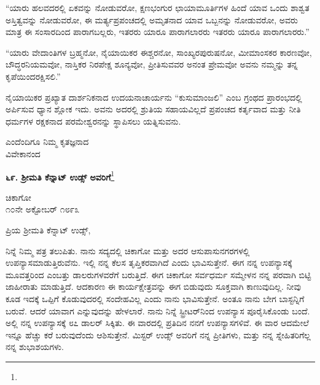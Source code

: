 “ಯಾರು ಹಲವದರಲ್ಲಿ ಏಕವನ್ನು ನೋಡುವರೋ, ಕ್ಷಣಭಂಗುರ ಛಾಯಾಮೂರ್ತಿ\break ಗಳ ಹಿಂದೆ ಯಾವ ಒಂದು ಶಾಶ್ವತ ಅಸ್ತಿತ್ವವನ್ನು ನೋಡುವರೋ, ಈ ಮರ್ತ್ಯಪ್ರಪಂಚದಲ್ಲಿ ಅಮೃತನಾದ ಯಾವ ಒಬ್ಬನನ್ನು ನೋಡುವರೋ, ಅವರು ಮಾತ್ರ ಈ ಸಂಸಾರದಿಂದ ಪಾರಾಗಬಲ್ಲರು, ಇತರರು ಯಾರೂ ಪಾರಾಗಲಾರರು\enginline{-} ಇತರರು ಯಾರೂ ಪಾರಾಗಲಾರರು.”

“ಯಾರು ವೇದಾಂತಿಗಳ ಬ್ರಹ್ಮನೋ, ನೈಯಾಯಿಕರ ಈಶ್ಚರನೋ, ಸಾಂಖ್ಯರ\break ಪುರುಷನೋ, ಮೀಮಾಂಸಕರ ಕಾರಣವೋ, ಬೌದ್ಧರನಿಯಮವೋ, ನಾಸ್ತಿಕರ ನಿರಪೇಕ್ಷ ಶೂನ್ಯವೋ, ಪ್ರೀತಿಸುವವರ ಅನಂತ ಪ್ರೇಮವೋ ಅವನು ನಮ್ಮನ್ನು ತನ್ನ ಕೃಪೆಯಿಂದ\break ರಕ್ಷಿಸಲಿ.”

ನೈಯಾಯಿಕರ ಪ್ರಖ್ಯಾತ ದಾರ್ಶನಿಕನಾದ ಉದಯನಾಚಾರ್ಯನು “ಕುಸುಮಾಂ\break ಜಲಿ” ಎಂಬ ಗ್ರಂಥದ ಪ್ರಾರಂಭದಲ್ಲಿ ಅರ್ಪಿಸುವ ಧ್ಯಾನ ಶ್ಲೋಕ ಇದು. ಅವನು ಅದರಲ್ಲಿ ಶ್ರುತಿಯ ಸಹಾಯವಿಲ್ಲದೆ ಪ್ರಪಂಚದ ಕರ್ತೃವಾದ ಮತ್ತು ನೀತಿ ಧರ್ಮಗಳ ರಕ್ಷಕನಾದ ಪರಮೇಶ್ವರನನ್ನು ಸ್ಥಾಪಿಸಲು ಯತ್ನಿಸುವನು.

\vspace{-.5cm}

{\flushright
ಎಂದೆಂದಿಗೂ ನಿಮ್ಮ ಕೃತಜ್ಞನಾದ\\ವಿವೇಕಾನಂದ\par}

\vspace{-.3cm}

\begin{center}
\textbf{೬೯. ಶ‍್ರೀಮತಿ ಕೆನ್ನಾಟ್ ಉಡ್ಸ್ ಅವರಿಗೆ}\footnote{}
\end{center}

\vspace{-.6cm}

\begin{flushright}
ಚಿಕಾಗೋ\\೧೦ನೇ ಅಕ್ಟೋಬರ್ ೧೮೯೩
\end{flushright}

\noindent
ಪ್ರಿಯ ಶ‍್ರೀಮತಿ ಕೆನ್ನಾಟ್ ಉಡ್ಸ್,

ನಿನ್ನೆ ನಿಮ್ಮ ಪತ್ರ ತಲುಪಿತು. ನಾನು ಸದ್ಯದಲ್ಲಿ ಚಿಕಾಗೋ ಮತ್ತು ಅದರ ಆಸುಪಾಸುನಗರಗಳಲ್ಲಿ ಉಪನ್ಯಾಸಮಾಡುತ್ತಿರುವೆನು. ಇಲ್ಲಿ ನನ್ನ ಕೆಲಸ ತೃಪ್ತಿಕರವಾಗಿದೆ ಎಂದು ಭಾವಿಸುತ್ತೇನೆ. ಈಗ ನನ್ನ ಉಪನ್ಯಾಸಕ್ಕೆ ಮೂವತ್ತರಿಂದ ಎಂಬತ್ತು ಡಾಲರುಗಳವರೆಗೆ ಬರುತ್ತಿದೆ. ಈಗ ಚಿಕಾಗೋ ಸರ್ವಧರ್ಮ ಸಮ್ಮೇಳನ ನನ್ನ ಪರವಾಗಿ ಬಿಟ್ಟಿ ಜಾಹೀರಾತು ಮಾಡುತ್ತಿದೆ. ಆದಕಾರಣ ಈ ಕಾರ್ಯಕ್ಷೇತ್ರವನ್ನು ಈಗ ಬಿಡುವುದು ಸೂಕ್ತವಾಗಿ ಕಾಣುವುದಿಲ್ಲ. ನೀವು ಕೂಡ ಇದಕ್ಕೆ ಒಪ್ಪಿಗೆ ಕೊಡುವುದರಲ್ಲಿ ಸಂದೇಹವಿಲ್ಲ ಎಂದು ನಾನು ಭಾವಿಸುತ್ತೇನೆ. ಅಂತೂ ನಾನು ಬೇಗ ಬಾಸ್ಟನ್ನಿಗೆ ಬರುವೆ. ಆದರೆ ಯಾವಾಗ ಎನ್ನುವುದನ್ನು ಹೇಳಲಾರೆ. ನಾನು ನಿನ್ನೆ ಸ್ಟ್ರೀಟರ್‌ನಿಂದ ಉಪನ್ಯಾಸ ಪೂರೈಸಿಕೊಂಡು ಬಂದೆ. ಅಲ್ಲಿ ನನ್ನ ಉಪನ್ಯಾಸಕ್ಕೆ ೮೭ ಡಾಲರ್ ಸಿಕ್ಕಿತು. ಈ ವಾರದಲ್ಲಿ ಪ್ರತಿದಿನ ನನಗೆ ಉಪನ್ಯಾಸಗಳಿವೆ. ಈ ವಾರ ಆದಮೇಲೆ ಇನ್ನೂ ಹೆಚ್ಚು ಕರೆ ಬರುವುದೆಂದು ಆಶಿಸುತ್ತೇನೆ. ಮಿಸ್ಟರ್ ಉಡ್ಸ್ ಅವರಿಗೆ ನನ್ನ ಪ್ರೀತಿಗಳು, ಮತ್ತು ನನ್ನ ಸ್ನೇಹಿತರಿಗೆಲ್ಲ ನನ್ನ ಶುಭಾಶಯಗಳು.
\vspace{-0.3cm}

